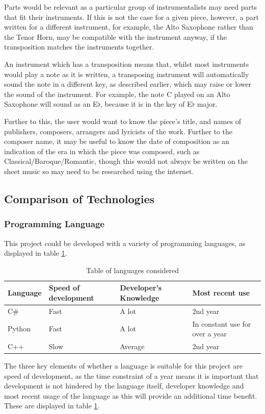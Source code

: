 Parts would be relevant as a particular group of instrumentalists may need parts that fit their instruments. If this is not the case for a given piece, however, a part written for a different instrument, for example, the Alto Saxophone rather than the Tenor Horn, may be compatible with the instrument anyway, if the transposition matches the instruments together. 

An instrument which has a transposition means that, whilst most instruments would play a note as it is written, a transposing instrument will automatically sound the note in a different key, as described earlier, which may raise or lower the sound of the instrument. For example, the note C played on an Alto Saxophone will sound as an E$\flat$, because it is in the key of E$\flat$ major. 

Further to this, the user would want to know the piece's title, and names of publishers, composers, arrangers and lyricists of the work. Further to the composer name, it may be useful to know the date of composition as an indication of the era in which the piece was composed, such as Classical/Baroque/Romantic, though this would not always be written on the sheet music so may need to be researched using the internet.


\subsection{Comparison of Technologies}
\subsubsection{Programming Language}
This project could be developed with a variety of programming languages, as displayed in table \ref{table:langs}.

\begin{table}[H]
\centering
\begin{tabular}{| l | l | l | l |} \hline
  {Language} & {Speed of development} & {Developer's Knowledge} & {Most recent use} \\ \hline
  C\# & Fast & A lot & 2nd year \\ \hline
  Python & Fast & A lot & In constant use for over a year \\ \hline
  C++ & Slow & Average & 2nd year \\ \hline
\end{tabular}
\caption{Table of languages considered}
\label{table:langs}
\end{table}
The three key elements of whether a language is suitable for this project are speed of development, as the time constraint of a year means it is important that development is not hindered by the language itself, developer knowledge and most recent usage of the language as this will provide an additional time benefit. These are displayed in table \ref{table:langs}.

